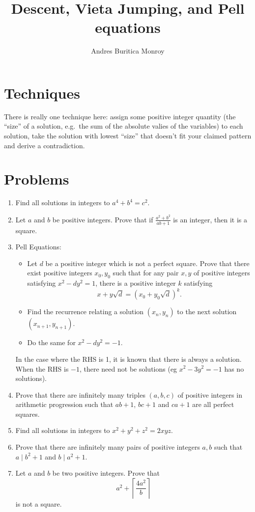 \documentclass{article}
\title{Descent, Vieta Jumping, and Pell equations}
\author{Andres Buritica Monroy}
\date{}
\begin{document}
\maketitle
\section{Techniques}
  There is really one technique here: assign some positive integer quantity
  (the ``size'' of a solution, e.g.\ the sum of the absolute valies of the
  variables) to each solution, take the solution with lowest
  ``size'' that doesn't fit your claimed pattern and derive a contradiction.
\section{Problems}
\begin{enumerate}
  \item Find all solutions in integers to $a^4+b^4=c^2$.
  \item Let $a$ and $b$ be positive integers.
    Prove that if \(\frac{a^2+b^2}{ab+1}\) is an integer, then it is a square.
  \item Pell Equations:
    \begin{itemize}
      \item Let $d$ be a positive integer which is not a perfect square. Prove that
      there exist positive integers $x_0,y_0$ such that for any pair $x,y$ of
      positive integers satisfying $x^2-dy^2=1$, there is a positive integer $k$
      satisfying
      \[x+y\sqrt d=(x_0+y_0\sqrt d)^k.\]
      \item Find the recurrence relating a solution $(x_n,y_n)$ to the next
        solution $(x_{n+1},y_{n+1})$.
      \item Do the same for $x^2-dy^2=-1$.
    \end{itemize}
    In the case where the RHS is 1, it is known that there is always a solution.
    When the RHS
    is $-1$, there need not be solutions (eg $x^2-3y^2=-1$ has no solutions).
  \item Prove that there are infinitely many triples $(a,b,c)$ of positive
    integers in arithmetic progression
    such that $ab+1$, $bc+1$ and $ca+1$ are all perfect squares.
  \item Find all solutions in integers to $x^2+y^2+z^2=2xyz$.
  \item Prove that there are infinitely many pairs of positive integers $a,b$
    such that $a\mid b^2+1$ and $b\mid a^2+1$.
  \item Let $a$ and $b$ be two positive integers. Prove that
    \[a^2+\left\lceil\frac{4a^2}b\right\rceil\] is not a square.
\end{enumerate}
\newpage
\end{document}
